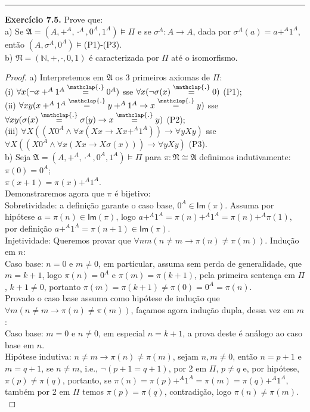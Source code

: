 \documentclass[11pt]{article}
\theoremstyle{definition}
\newcommand{\mf}[1]{\mathfrak{#1}}
\newcommand{\msf}[1]{\mathsf{#1}}
\newcommand{\mbb}[1]{\mathbb{#1}}
\newcommand\overtext[2]{\stackrel{\mathclap{\normalfont\mbox{#1}}}{#2}}
\begin{document}
\hrule

\textbf{Exercício 7.5.} Prove que:\\
a) Se $\mf{A}=(A,+^A,\cdot^A,0^A,1^A)\vDash\Pi$ e se $\sigma^A:A\to A$, dada por $\sigma^A(a)=a+^A1^A$, então $(A,\sigma^A,0^A)\vDash$(P1)-(P3).\\
b) $\mf{N}=(\mbb{N},+,\cdot,0,1)$ é caracterizada por $\Pi$ até o isomorfismo.

\begin{proof}
    a) Interpretemos em $\mf{A}$ os 3 primeiros axiomas de $\Pi$:\\
    (i) $\forall x(\neg x+^A1^A\overtext{.}{=}0^A)$ sse $\forall x(\neg\sigma(x)\overtext{.}{=}0)$ (P1);\\
    (ii) $\forall xy(x+^A1^A\overtext{.}{=}y+^A1^A\rightarrow x\overtext{.}{=}y)$ sse $\forall xy(\sigma(x)\overtext{.}{=}\sigma(y)\rightarrow x\overtext{.}{=}y)$ (P2);\\
    (iii) $\forall X((X0^A\wedge\forall x(Xx\rightarrow Xx+^A1^A))\rightarrow\forall yXy)$ sse $\forall X((X0^A\wedge\forall x(Xx\rightarrow X\sigma(x)))\rightarrow\forall yXy)$ (P3).\\
    b) Seja $\mf{A}=(A,+^A,\cdot^A,0^A,1^A)\vDash\Pi$ para $\pi:\mf{N}\cong\mf{A}$ definimos indutivamente:\\
    $\pi(0)=0^A$;\\
    $\pi(x+1)=\pi(x)+^A1^A$.\\
    Demonstraremos agora que $\pi$ é bijetivo:\\
    Sobretividade: a definição garante o caso base, $0^A\in\msf{Im}(\pi)$. Assuma por hipótese $a=\pi(n)\in\msf{Im}(\pi)$, logo $a+^A1^A=\pi(n)+^A1^A=\pi(n)+^A\pi(1)$, por definição $a+^A1^A=\pi(n+1)\in\msf{Im}(\pi)$.\\
    Injetividade: Queremos provar que $\forall nm(n\ne m\rightarrow\pi(n)\ne\pi(m))$. Indução em $n$:\\
    Caso base: $n=0$ e $m\ne0$, em particular, assuma sem perda de generalidade, que $m=k+1$, logo $\pi(n)=0^A$ e $\pi(m)=\pi(k+1)$, pela primeira sentença em $\Pi$, $k+1\ne0$, portanto $\pi(m)=\pi(k+1)\ne\pi(0)=0^A=\pi(n)$.\\
    Provado o caso base assuma como hipótese de indução que $\forall m(n\ne m\rightarrow\pi(n)\ne\pi(m))$, façamos agora indução dupla, dessa vez em $m$:\\
    Caso base: $m=0$ e $n\ne0$, em especial $n=k+1$, a prova deste é análogo ao caso base em $n$.\\
    Hipótese indutiva: $n\ne m\rightarrow\pi(n)\ne\pi(m)$, sejam $n,m\ne0$, então $n=p+1$ e $m=q+1$, se $n\ne m$, i.e., $\neg(p+1=q+1)$, por 2 em $\Pi$, $p\ne q$ e, por hipótese, $\pi(p)\ne\pi(q)$, portanto, se $\pi(n)=\pi(p)+^A1^A=\pi(m)=\pi(q)+^A1^A$, também por 2 em $\Pi$ temos $\pi(p)=\pi(q)$, contradição, logo $\pi(n)\ne\pi(m)$.\\

\end{proof}
\end{document}
